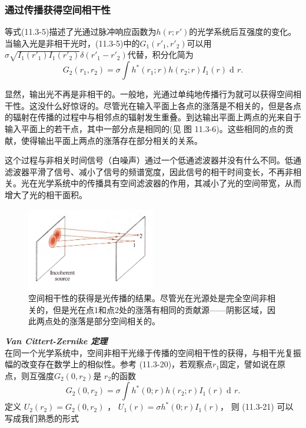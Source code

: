 \documentclass[UTF8]{ctexart}
\numberwithin{figure}{subsection}
\numberwithin{table}{subsection}
\DeclareMathOperator\dif{d\!}
\begin{document}
\subsubsection{通过传播获得空间相干性}
\endgroup
等式(11.3-5)描述了光通过脉冲响应函数为$h(r; r')$的光学系统后互强度的变化。当输入光是非相干光时，(11.3-5)中的$G_1 (r'_1, r'_2)$可以用$\sigma \sqrt{I_1 (r'_1) I_1 (r'_2)} \delta (r'_1 - r'_2)$代替，积分化简为
\begin{equation}
G_2 (r_1, r_2) = \sigma \int h^\ast (r_1; r) h(r_2; r) I_1 (r) \dif r .
\end{equation}
\par 显然，输出光不再是非相干的。一般地，光通过单纯地传播行为就可以获得空间相干性。这没什么好惊讶的。尽管光在输入平面上各点的涨落是不相关的，但是各点的辐射在传播的过程中与相邻点的辐射发生重叠。到达输出平面上两点的光来自于输入平面上的若干点，其中一部分点是相同的(见 图 11.3-6)。这些相同的点的贡献，使得输出平面上两点的涨落存在部分相关的关系。
\par 这个过程与非相关时间信号（白噪声）通过一个低通滤波器并没有什么不同。低通滤波器平滑了信号、减小了信号的频谱宽度，因此信号的相干时间变长，不再非相关。光在光学系统中的传播具有空间滤波器的作用，其减小了光的空间带宽，从而增大了光的相干面积。
\begin{figure}[H]
\centering
\includegraphics[width=0.5\textwidth]{11_3_6.PNG}
\caption{空间相干性的获得是光传播的结果。尽管光在光源处是完全空间非相关的，但是光在点1和点2处的涨落有相同的贡献源——阴影区域，因此两点处的涨落是部分空间相关的。}
\label{fig: 11_3_6}
\end{figure}
\bigbreak\noindent\textcolor{ksc}{\textbf{\textsl{Van Cittert-Zernike 定理}}}\\
在同一个光学系统中，空间非相干光缘于传播的空间相干性的获得，与相干光复振幅的改变存在数学上的相似性。参考 (11.3-20)，若观察点$r_1$固定，譬如说在原点，则互强度$G_2 (0, r_2)$是 $r_2$的函数
\begin{equation}
G_2(0, r_2) = \sigma \int h^\ast (0; r) h(r_2; r) I_1 (r) \dif r .
\end{equation}
定义 $U_2 (r_2) = G_2 (0, r_2)$ ， $U_1 (r) = \sigma h^\ast (0; r) I_1 (r)$， 则 (11.3-21) 可以写成我们熟悉的形式
\end{document}

